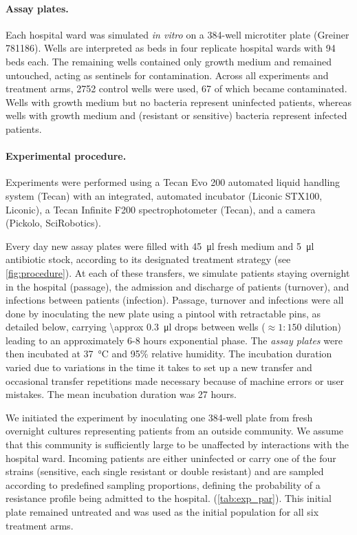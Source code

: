 \paragraph{Assay plates.}
Each hospital ward was simulated \textit{in vitro} on a 384-well microtiter plate (Greiner 781186).
Wells are interpreted as beds in four replicate hospital wards with 94 beds each.
The remaining wells contained only growth medium and remained untouched, acting as sentinels for contamination.
Across all experiments and treatment arms, 2752 control wells were used, 67 of which became contaminated.
Wells with growth medium but no bacteria represent uninfected patients, whereas wells with growth medium and (resistant or sensitive) bacteria represent infected patients.

\paragraph{Experimental procedure. \label{par:setup}}
Experiments were performed using a Tecan Evo 200 automated liquid handling system (Tecan) with an integrated, automated incubator (Liconic STX100, Liconic), a Tecan Infinite F200 spectrophotometer (Tecan), and a camera (Pickolo, SciRobotics).

Every day new assay plates were filled with \SI{45}{\micro \l} fresh medium and \SI{5}{\micro \l} antibiotic stock, according to its designated treatment strategy (see \autoref{fig:procedure}).
At each of these transfers, we simulate patients staying overnight in the hospital (passage), the admission and discharge of patients (turnover), and infections between patients (infection).
Passage, turnover and infections were all done by inoculating the new plate using a pintool with retractable pins, as detailed below, carrying \SI{\approx 0.3}{\micro \litre} drops between wells ($\approx1:150$ dilution) leading to an approximately 6-8 hours exponential phase.
The \textit{assay plates} were then incubated at \SI{37}{\celsius} and 95\% relative humidity.
The incubation duration varied due to variations in the time it takes to set up a new transfer and occasional transfer repetitions made necessary because of machine errors or user mistakes.
The mean incubation duration was 27 hours.

We initiated the experiment by inoculating one 384-well plate from fresh overnight cultures representing patients from an outside community.
We assume that this community is sufficiently large to be unaffected by interactions with the hospital ward.
Incoming patients are either uninfected or carry one of the four strains (sensitive, each single resistant or double resistant) and are sampled according to predefined sampling proportions, defining the probability of a resistance profile being admitted to the hospital. (\autoref{tab:exp_par}).
This initial plate remained untreated and was used as the initial population for all six treatment arms.

